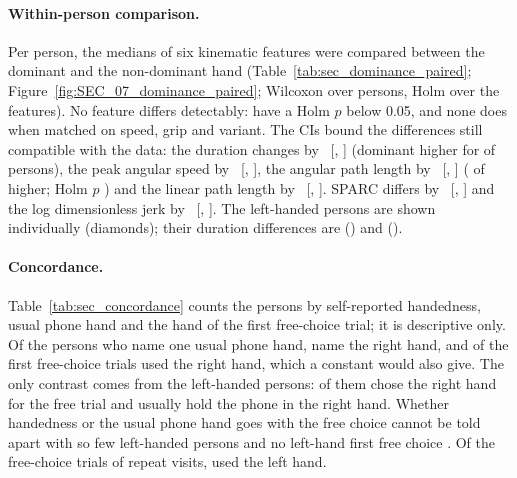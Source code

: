 \paragraph{Within-person comparison.} Per person, the medians of six kinematic features were compared between the
dominant and the non-dominant hand (Table~\ref{tab:sec_dominance_paired}; Figure~\ref{fig:SEC_07_dominance_paired};
Wilcoxon over persons, Holm over the  features). No feature differs detectably:
 have a Holm $p$ below 0.05, and none does when matched on speed, grip and variant. The CIs bound
the differences still compatible with the data: the duration changes by ~[,
] (dominant higher for  of 
persons), the peak angular speed by ~[,
], the angular path length by ~[,
] ( of  higher; Holm $p$
) and the linear path length by ~[,
]. SPARC differs by ~[,
] and the log dimensionless jerk by ~[,
]. The left-handed persons are shown individually (diamonds); their duration differences
are  () and  ().

\paragraph{Concordance.} Table~\ref{tab:sec_concordance} counts the persons by self-reported handedness, usual phone
hand and the hand of the first free-choice trial; it is descriptive only. Of the 
persons who name one usual phone hand,  name the right hand, and  of the  first
free-choice trials used the right hand, which a constant would also give. The only contrast comes from the
 left-handed persons:  of them chose the right hand for the free trial
and  usually hold the phone in the right hand. Whether handedness or the usual phone
hand goes with the free choice cannot be told apart with so few left-handed persons and no left-hand first free
choice \cite{papadatoupastou2020handedness}. Of the  free-choice trials of repeat visits,
 used the left hand.

